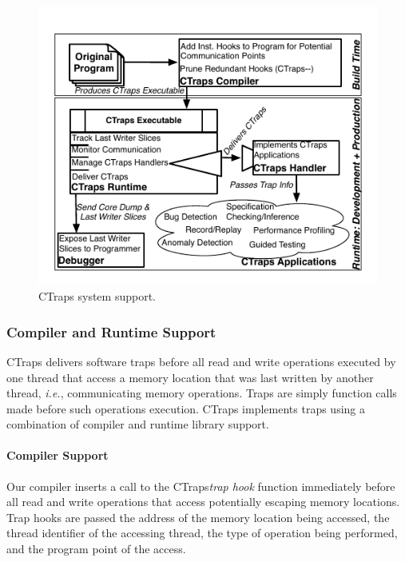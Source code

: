 \documentclass[preprint,9pt]{sigplanconf}
\newcommand{\ctraps}{CTraps\xspace}
\begin{document}
\begin{figure}[htb]
\centering
\includegraphics[width=.90\columnwidth]{figs/SystemDiagram.pdf}
\caption{\label{fig:systemdiagram}CTraps system support.}
\end{figure}



\subsubsection{Compiler and Runtime Support} 

\ctraps delivers software traps before all read and write operations executed
by one thread that access a memory location that was last written by another
thread, {\em i.e.}, communicating memory operations.  Traps are simply function
calls made before such operations execution.  \ctraps implements traps using a
combination of compiler and runtime library support.

\paragraph{Compiler Support}
Our compiler inserts a call to the \ctraps {\em trap hook} function immediately
before all read and write operations that access potentially escaping memory
locations.  Trap hooks are passed the address of the memory location being
accessed, the thread identifier of the accessing thread, the type of operation
being performed, and the program point of the access.  
\end{document}
